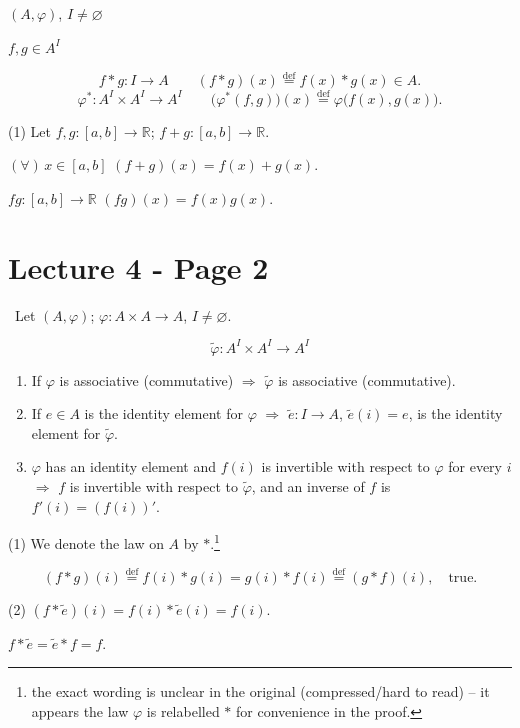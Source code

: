 \medskip
\noindent $(A,\varphi)$, $I\neq\varnothing$

\noindent $f,g\in A^I$

\[
f*g : I\to A \qquad (f*g)(x) \overset{\text{def}}{=} f(x)*g(x) \in A.
\]
\[
\varphi^* : A^I\times A^I \to A^I \qquad \big(\varphi^*(f,g)\big)(x) \overset{\text{def}}{=} \varphi\big(f(x),g(x)\big).
\]

\medskip
\noindent (1) Let $f,g : [a,b]\to\mathbb{R}$; \quad $f+g : [a,b]\to\mathbb{R}$.

\noindent $(\forall)\, x\in[a,b]$ \qquad $(f+g)(x) = f(x)+g(x)$.

\noindent $fg : [a,b]\to\mathbb{R}$ \qquad $(fg)(x) = f(x)g(x)$.




\section*{Lecture 4 - Page 2}

\noindent{} \ Let $(A,\varphi)$; $\varphi : A\times A \to A$, $I\neq\varnothing$.

\[
\tilde\varphi : A^I \times A^I \to A^I
\]

\begin{enumerate}
\item[(1)] If $\varphi$ is associative (commutative) $\Rightarrow$ $\tilde\varphi$ is associative (commutative).
\item[(2)] If $e\in A$ is the identity element for $\varphi$ $\Rightarrow$ $\tilde e : I\to A$, $\tilde e(i)=e$, is the identity element for $\tilde\varphi$.
\item[(3)] $\varphi$ has an identity element and $f(i)$ is invertible with respect to $\varphi$ for every $i$ $\Rightarrow$ $f$ is invertible with respect to $\tilde\varphi$, and an inverse of $f$ is $f'(i) = (f(i))'$.
\end{enumerate}

\bigskip
\noindent (1) We denote the law on $A$ by $*$.\footnote{the exact wording is unclear in the original (compressed/hard to read) -- it appears the law $\varphi$ is relabelled $*$ for convenience in the proof.}

\[
(f*g)(i) \overset{\text{def}}{=} f(i)*g(i) = g(i)*f(i) \overset{\text{def}}{=} (g*f)(i), \quad \text{true.}
\]

\noindent (2) $(f*\tilde e)(i) = f(i)*\tilde e(i) = f(i)$.

\noindent $f*\tilde e = \tilde e*f = f$.


